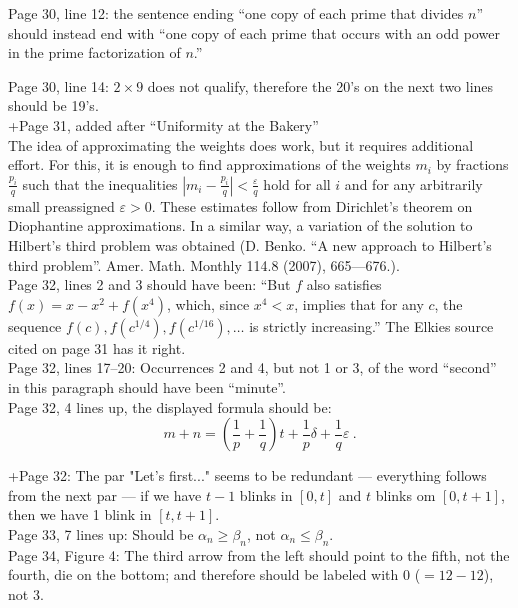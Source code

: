 \documentclass[11pt]{article}
\newcommand{\ep}{\varepsilon}
\begin{document}
Page 30, line 12: the sentence ending ``one copy of each prime that divides $n$'' should
instead end with ``one copy of each prime that occurs with an odd power in the
prime factorization of $n$.''

Page 30, line 14: $2\times9$ does not qualify, therefore the 20's on the next two lines should be 19's.\\

+Page 31, added after ``Uniformity at the Bakery''\\

The idea of approximating the weights does work, but it requires additional effort.
For this, it is enough to find approximations of the weights \( m_i \) by fractions \( \tfrac{p_i}q \) such that the inequalities
\( |m_i - \tfrac{p_i}q| < \tfrac\varepsilon q \)
hold for all \( i \) and for any arbitrarily small preassigned \( \varepsilon > 0 \).
These estimates follow from Dirichlet's theorem on Diophantine approximations.
In a similar way, a variation of the solution to Hilbert's third problem was obtained (D. Benko. ``A new approach to Hilbert’s third problem''. Amer. Math. Monthly 114.8
(2007),  665—676.).\\


Page 32, lines 2 and 3 should have been: 
``But $f$ also satisfies $f(x) = x -x^2 + f(x^4)$, which, since $x^4 < x$, implies that for any $c$, the
sequence $f(c),f(c^{1/4}),f(c^{1/16}),\dots$ is strictly increasing.''  The Elkies source cited on page 31
has it right.\\

Page 32, lines 17--20:  Occurrences 2 and 4, but not 1 or 3, of the
word ``second'' in this paragraph should have been ``minute''.\\

Page 32, 4 lines up, the displayed formula should be:
$$
m + n = \left( \frac1p + \frac 1q \right)t + \frac1p \delta + \frac1q \ep~.
$$

+Page 32: The par "Let's first..."  seems to be redundant --- everything follows from
the next par --- if we have $t-1$ blinks in $[0,t]$
and $t$ blinks om $[0,t+1]$, then we have 1 blink in $[t,t+1]$.\\

Page 33, 7 lines up: Should be $\alpha_n \ge \beta_n$, not $\alpha_n \le \beta_n$.\\

Page 34, Figure 4: The third arrow from the left should point to the fifth, not the
fourth, die on the bottom; and therefore should be labeled with 0 ($= 12 - 12$), not 3.\\
\end{document}
